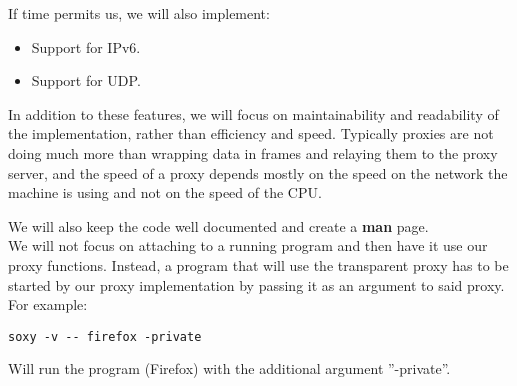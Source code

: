 \documentclass[a4paper]{article}
\begin{document}
If time permits us, we will also implement:

\begin{itemize}
\item Support for IPv6.
\item Support for UDP.
\end{itemize}

In addition to these features, we will focus on maintainability and readability
of the implementation, rather than efficiency and speed. Typically proxies are
not doing much more than wrapping data in frames and relaying them to the proxy
server, and the speed of a proxy depends mostly on the speed on the network the
machine is using and not on the speed of the CPU.

We will also keep the code well documented and create a \textbf{man} page. \\

We will not focus on attaching to a running program and then have it use our
proxy functions. %
Instead, a program that will use the transparent proxy has to be started by our
proxy implementation by passing it as an argument to said proxy. For example:

\begin{verbatim}
soxy -v -- firefox -private
\end{verbatim}

Will run the program (Firefox) with the additional argument ''-private''.
\end{document}
